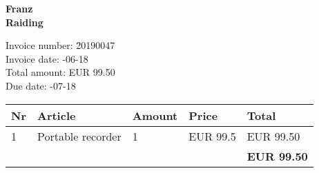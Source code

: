 \documentclass[a4paper]{article}
\begin{document}
\noindent\textbf{Franz\\Raiding}

\vspace{8mm}



\begin{tabbing}
Invoice number: \= 20190047 \\
Invoice date:   -06-18 \\
Total amount:   \> EUR 99.50 \\
Due date:       -07-18 \\
\end{tabbing}

\begin{tabular}{lp{30mm}ll|l}\\ \hline
{\bfseries Nr} &
{\bfseries Article} &
{\bfseries Amount} &
{\bfseries Price} &
{\bfseries Total} \\ \hline\hline
1 &Portable recorder &1 &EUR 99.5 &EUR 99.50\\\hline
 & & & & \textbf{EUR 99.50} \\
\end{tabular}
\end{document}
